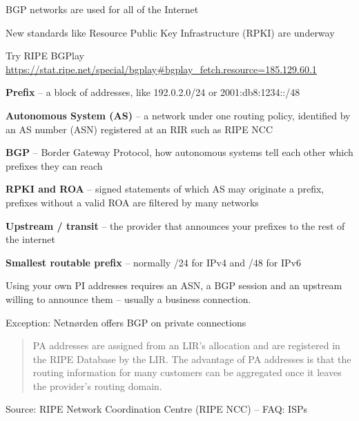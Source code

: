 \documentclass[Screen16to9,17pt]{foils}
\begin{document}


\begin{list2}
\item BGP networks are used for all of the Internet
\item New standards like Resource Public Key Infrastructure (RPKI) are underway
\item Try RIPE BGPlay \url{https://stat.ripe.net/special/bgplay#bgplay_fetch.resource=185.129.60.1}
\end{list2}



\begin{list2}
\item {\bf Prefix} -- a block of addresses, like 192.0.2.0/24 or 2001:db8:1234::/48
\item {\bf Autonomous System (AS)} -- a network under one routing policy, identified by an AS number (ASN) registered at an RIR such as RIPE NCC
\item {\bf BGP} -- Border Gateway Protocol, how autonomous systems tell each other which prefixes they can reach
\item {\bf RPKI and ROA} -- signed statements of which AS may originate a prefix, prefixes without a valid ROA are filtered by many networks
\item {\bf Upstream / transit} -- the provider that announces your prefixes to the rest of the internet
\item {\bf Smallest routable prefix} -- normally /24 for IPv4 and /48 for IPv6
\item Using your own PI addresses requires an ASN, a BGP session and an upstream willing to announce them -- usually a business connection.
\item Exception: Netnørden offers BGP on private connections 
\end{list2}



\begin{quote}
PA addresses are assigned from an LIR's allocation and are registered in the RIPE Database
by the LIR. The advantage of PA addresses is that the routing information for many customers
can be aggregated once it leaves the provider's routing domain.
\end{quote}
Source: RIPE Network Coordination Centre (RIPE NCC) -- FAQ: ISPs\\
\end{document}
